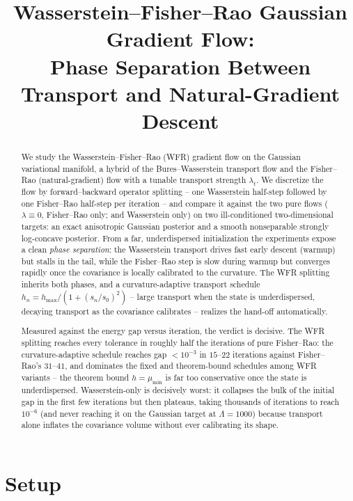 \documentclass[11pt]{article}
\title{Wasserstein--Fisher--Rao Gaussian Gradient Flow:\\
Phase Separation Between Transport and Natural-Gradient Descent}
\author{}
\date{}
\begin{document}
\maketitle

\begin{abstract}
We study the Wasserstein--Fisher--Rao (WFR) gradient flow on the Gaussian
variational manifold, a hybrid of the Bures--Wasserstein transport flow and the
Fisher--Rao (natural-gradient) flow with a tunable transport strength
$\lambda_t$. We discretize the flow by forward--backward operator splitting --
one Wasserstein half-step followed by one Fisher--Rao half-step per iteration --
and compare it against the two pure flows ($\lambda\equiv 0$, Fisher--Rao only;
and Wasserstein only) on two ill-conditioned two-dimensional targets: an exact
anisotropic Gaussian posterior and a smooth nonseparable strongly log-concave
posterior. From a far, underdispersed initialization the experiments expose a
clean \emph{phase separation}: the Wasserstein transport drives fast early
descent (warmup) but stalls in the tail, while the Fisher--Rao step is slow
during warmup but converges rapidly once the covariance is locally calibrated to
the curvature. The WFR splitting inherits both phases, and a curvature-adaptive
transport schedule $h_n = h_{\max}/(1+(s_n/s_0)^2)$ -- large transport when the
state is underdispersed, decaying transport as the covariance calibrates --
realizes the hand-off automatically.

Measured against the energy gap versus iteration, the verdict is decisive. The
WFR splitting reaches every tolerance in roughly half the iterations of pure
Fisher--Rao: the curvature-adaptive schedule reaches gap $<10^{-3}$ in $15$--$22$
iterations against Fisher--Rao's $31$--$41$, and dominates the fixed and
theorem-bound schedules among WFR variants -- the theorem bound $h=\mu_{\min}$ is
far too conservative once the state is underdispersed. Wasserstein-only is
decisively worst: it collapses the bulk of the initial gap in the first few
iterations but then plateaus, taking thousands of iterations to reach $10^{-6}$
(and never reaching it on the Gaussian target at $\Lambda=1000$) because
transport alone inflates the covariance volume without ever calibrating its
shape.
\end{abstract}

\tableofcontents

\section{Setup}
\label{sec:setup}
\end{document}
